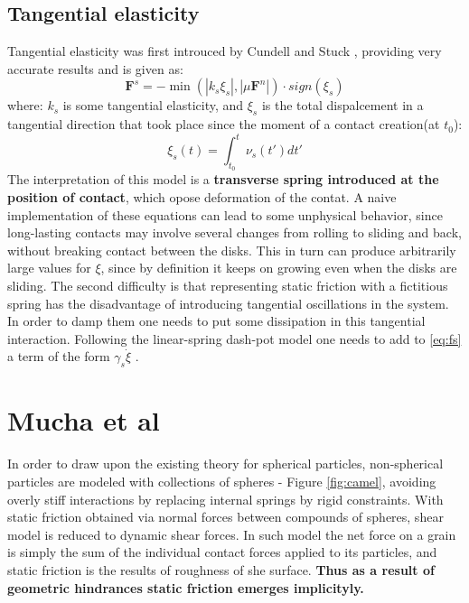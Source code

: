 \documentclass[10pt,a4paper]{article}
\begin{document}
\subsection{Tangential elasticity}
Tangential elasticity was first introuced by Cundell and Stuck \cite{cs79}, providing very accurate results and is given as:
\begin{equation} \label{eq:fs}
 \mathbf{F}^s = -\min(|k_s \xi_s|,|\mu \mathbf{F}^n|) \cdot sign(\xi_s)
\end{equation}
where: $k_s$ is some tangential elasticity, and $\xi_s$ is the total dispalcement in a tangential direction that took place
since the moment of a contact creation(at $t_0$):
\begin{equation}
 \xi_s(t) = \int^{t}_{t_0} \nu_s(t')dt'
\end{equation}
The interpretation of this model is a \textbf{transverse spring introduced at the position of contact}, which opose deformation of the contat.
A naive implementation of these equations can lead to some unphysical behavior,
since long-lasting contacts may involve several changes from rolling to sliding and
back, without breaking contact between the disks. This in turn can produce arbitrarily large values for $\xi$, 
since by definition it keeps on growing even when the
disks are sliding. 
The second difficulty is that representing static friction with a fictitious spring has the disadvantage 
of introducing tangential oscillations in the
system. In order to damp them one needs to put some dissipation in this tangential
interaction. Following the linear-spring dash-pot model one needs to add to \ref{eq:fs}
a term of the form $\gamma_s \dot{\xi}$ \cite{perez}.


\section{Mucha et al \cite{mucha05}}
In order to draw upon the existing theory for spherical particles, non-spherical particles are modeled with collections of spheres - Figure \ref{fig:camel}, 
avoiding overly stiff interactions by replacing internal springs by rigid constraints. 
With static friction obtained via normal forces between compounds of spheres, shear model is reduced to dynamic shear forces.
In such model the net force on a grain is simply the sum of the individual contact forces applied to its particles,
and static friction is the results of roughness of she surface. \textbf{Thus as a result of geometric hindrances static friction emerges implicityly.}
\end{document}
